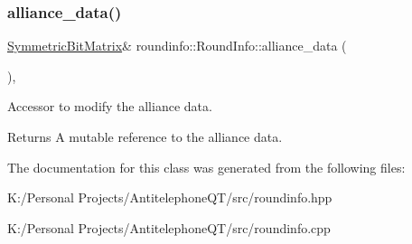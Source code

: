 \subsubsection{\texorpdfstring{alliance\+\_\+data()}{alliance\_data()}}
{\footnotesize\ttfamily \hyperlink{class_symmetric_bit_matrix}{Symmetric\+Bit\+Matrix}\& roundinfo\+::\+Round\+Info\+::alliance\+\_\+data (\begin{DoxyParamCaption}{ }\end{DoxyParamCaption})\hspace{0.3cm}{\ttfamily [inline]}, {\ttfamily [noexcept]}}



Accessor to modify the alliance data. 

\begin{DoxyReturn}{Returns}
A mutable reference to the alliance data. 
\end{DoxyReturn}


The documentation for this class was generated from the following files\+:\begin{DoxyCompactItemize}
\item 
K\+:/\+Personal Projects/\+Antitelephone\+Q\+T/src/roundinfo.\+hpp\item 
K\+:/\+Personal Projects/\+Antitelephone\+Q\+T/src/roundinfo.\+cpp\end{DoxyCompactItemize}
